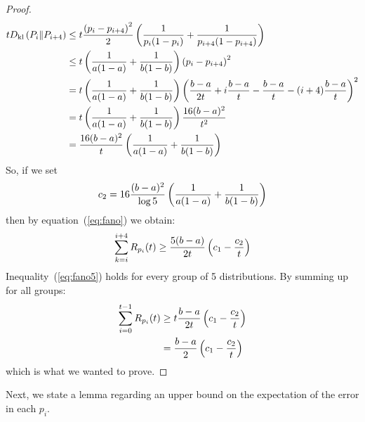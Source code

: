 \begin{proof}
\begin{align*}
    t D_{\mathrm{kl}} \left(P_i\|P_{i+4}\right) &\leq
    t \frac{\left(p_i - p_{i+4}\right)^2}{2}\left(\frac{1}{p_i(1-p_i)} + \frac{1}{p_{i+4}(1-p_{i+4})}\right)\\
    &\leq
    t\left(\frac{1}{a(1-a)} + \frac{1}{b(1-b)}\right) \left(p_i - p_{i+4}\right)^2\\
    &=
    t\left(\frac{1}{a(1-a)} + \frac{1}{b(1-b)}\right)\left(\frac{b-a}{2t} +
    i\frac{b-a}{t} - \frac{b-a}{t} -(i+4)\frac{b-a}{t}\right)^2\\
    &=
    t\left(\frac{1}{a(1-a)} + \frac{1}{b(1-b)}\right) \frac{16(b-a)^2}{t^2}\\
    &=
    \frac{16(b-a)^2}{t} \left(\frac{1}{a(1-a)} + \frac{1}{b(1-b)}\right)
  \end{align*}
  So, if we set
  $$c_2 = 16\frac{(b-a)^2}{\log5}\left(\frac{1}{a(1-a)} + \frac{1}{b(1-b)}\right)$$
  then by equation~(\ref{eq:fano}) we obtain:
  \begin{equation}\label{eq:fano5}
    \sum_{k =i}^{i+4}R_{p_i}(t) \geq \frac{5(b-a)}{2t}\left(c_1 - \frac{c_2}{t}\right)
  \end{equation}
  Inequality~(\ref{eq:fano5}) holds for every group of 5
  distributions. By summing up for all groups:
  \begin{align*}
    \sum_{i=0}^{t-1} R_{p_i}(t) &\geq t \frac{b-a}{2t}\left(c_1 - \frac{c_2}{t}\right)\\
    &= \frac{b-a}{2}\left(c_1 - \frac{c_2}{t}\right)
  \end{align*}
  which is what we wanted to prove.
\end{proof}

Next, we state a lemma regarding an upper bound on the
expectation of the error in each $p_i$.

